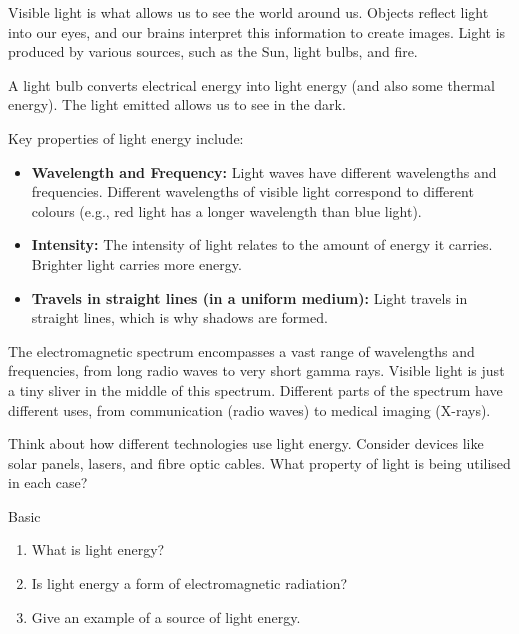 Visible light is what allows us to see the world around us.  Objects reflect light into our eyes, and our brains interpret this information to create images.  Light is produced by various sources, such as the Sun, light bulbs, and fire.

\begin{example}
A light bulb converts electrical energy into light energy (and also some thermal energy). The light emitted allows us to see in the dark.
\end{example}

Key properties of light energy include:

\begin{itemize}
    \item \textbf{Wavelength and Frequency:} Light waves have different wavelengths and frequencies.  Different wavelengths of visible light correspond to different colours (e.g., red light has a longer wavelength than blue light).
    \item \textbf{Intensity:} The intensity of light relates to the amount of energy it carries.  Brighter light carries more energy.
    \item \textbf{Travels in straight lines (in a uniform medium):} Light travels in straight lines, which is why shadows are formed.
\end{itemize}

\begin{marginnote}
The electromagnetic spectrum encompasses a vast range of wavelengths and frequencies, from long radio waves to very short gamma rays.  Visible light is just a tiny sliver in the middle of this spectrum.  Different parts of the spectrum have different uses, from communication (radio waves) to medical imaging (X-rays).
\end{marginnote}

\begin{stopandthink}
Think about how different technologies use light energy. Consider devices like solar panels, lasers, and fibre optic cables.  What property of light is being utilised in each case?
\end{stopandthink}


\begin{tieredquestions}{Basic}
\begin{enumerate}
    \item What is light energy?
    \item Is light energy a form of electromagnetic radiation?
    \item Give an example of a source of light energy.
\end{enumerate}
\end{tieredquestions}

